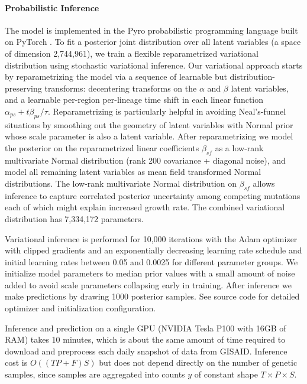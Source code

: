 \documentclass[12pt]{article}
\begin{document}
\paragraph*{Probabilistic Inference}

The model is implemented in the Pyro probabilistic programming language \cite{bingham2019pyro} built on PyTorch \cite{paszke2017automatic}.
To fit a posterior joint distribution over all latent variables (a space of dimension 2,744,961), we train a flexible reparametrized variational distribution using stochastic variational inference.
Our variational approach starts by reparametrizing the model via a sequence of learnable but distribution-preserving transforms: decentering transforms \cite{gorinova2020automatic} on the $\alpha$ and $\beta$ latent variables, and a learnable per-region per-lineage time shift in each linear function $\alpha_{ps}+t\beta_{ps}/\tau$.
Reparametrizing is particularly helpful in avoiding Neal's-funnel situations \cite{neal2003slice} by smoothing out the geometry of latent variables with Normal prior whose scale parameter is also a latent variable.
After reparametrizing we model the posterior on the reparametrized linear coefficients $\beta_{sf}$ as a low-rank multivariate Normal distribution (rank 200 covariance + diagonal noise), and model all remaining latent variables as mean field transformed Normal distributions.
The low-rank multivariate Normal distribution on $\beta_{sf}$ allows inference to capture correlated posterior uncertainty among competing mutations each of which might explain increased growth rate.
The combined variational distribution has 7,334,172 parameters.

Variational inference is performed for 10,000 iterations with the Adam optimizer with clipped gradients and an exponentially decreasing learning rate schedule and initial learning rates between 0.05 and 0.0025 for different parameter groups.
We initialize model parameters to median prior values with a small amount of noise added to avoid scale parameters collapsing early in training.
After inference we make predictions by drawing 1000 posterior samples.
See source code for detailed optimizer and initialization configuration.

Inference and prediction on a single GPU (NVIDIA Tesla P100 with 16GB of RAM) takes 10 minutes, which is about the same amount of time required to download and preprocess each daily snapshot of data from GISAID.
Inference cost is $O((TP+F)S)$ but does not depend directly on the number of genetic samples, since samples are aggregated into counts $y$ of constant shape $T\times P\times S$.
\end{document}

